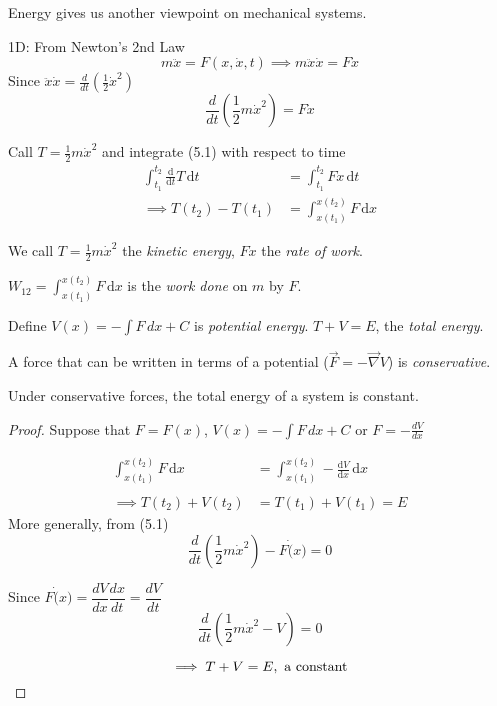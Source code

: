 \setcounter{lecture}{5}




Energy gives us another viewpoint on mechanical systems. 

1D: From Newton's 2nd Law
\[m\ddot{x} = F(x,\dot{x},t) \implies m\ddot{x}\dot{x} = F\dot{x}\]
Since $\ddot{x}\dot{x} = \frac{d}{dt}\left(\frac{1}{2}\dot{x}^2\right)$ \begin{equation}\boxed{ \frac{d}{dt}\left(\frac{1}{2}m\dot{x}^2\right) = F\dot{x}}\end{equation}


Call $T = \frac{1}{2}m\dot{x}^2$ and integrate (5.1) with respect to time
\[\begin{aligned}\int_{t_1}^{t_2}\frac{\mathrm{d}}{\mathrm{d}t}T\,\mathrm{d}t &= \int_{t_1}^{t_2}F\dot{x}\,\mathrm{d}t\\ 
\implies T(t_2) - T(t_1) &= \int_{x(t_1)}^{x(t_2)}F\,\mathrm{d}x	
\end{aligned}
\]

\begin{definition}We call $T = \frac{1}{2}m\dot{x}^2$ the \emph{kinetic energy}, $F\dot{x}$ the \emph{rate of work}.	


$\displaystyle{W_{12} = \int_{x(t_1)}^{x(t_2)}F\,\mathrm{d}x	}$ is the \emph{work done} on $m$ by $F$.

Define $\displaystyle{V(x) = -\int F\,dx + C}$ is \emph{potential energy}. $T + V = E$, the \emph{total energy}. 

A force that can be written in terms of a potential ($\vec{F} = -\vec{\nabla}V$) is \emph{conservative}.
\end{definition}


\begin{theorem}
Under conservative forces, the total energy of a system is constant.
\end{theorem}
\begin{proof}

Suppose that $F = F(x)$, $V(x) = -\int F\,dx + C$ or $F = -\frac{dV}{dx}$

\[\begin{aligned}  \int_{x(t_1)}^{x(t_2)}F\,\mathrm{d}x	 &= \int_{x(t_1)}^{x(t_2)} - \frac{\mathrm{d}V}{\mathrm{d}x}\,\mathrm{d}x\\
~\\
\implies T(t_2) + V(t_2) &= T(t_1) + V(t_1) = E
\end{aligned}
\]
More generally, from (5.1)
\[\frac{d}{dt}\left(\frac{1}{2}m\dot{x}^2\right) - F\dot(x) = 0\]

Since $F\dot(x) = \dfrac{dV}{dx}\dfrac{dx}{dt} = \dfrac{dV}{dt}$
\[\frac{d}{dt}\left(\frac{1}{2}m\dot{x}^2 - V\right) = 0
\]

\[\implies T + V = E, \text{ a constant}\qedhere\]
\end{proof}


